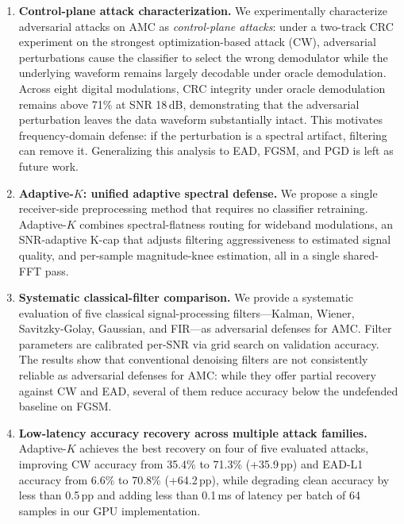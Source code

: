 \begin{enumerate}
\item \textbf{Control-plane attack characterization.}
  We experimentally characterize adversarial attacks on AMC as
  \emph{control-plane attacks}: under a two-track CRC experiment on the
  strongest optimization-based attack (CW), adversarial perturbations
  cause the classifier to select the wrong demodulator while the
  underlying waveform remains largely decodable under oracle
  demodulation. Across eight digital modulations, CRC integrity under
  oracle demodulation remains above 71\% at SNR 18\,dB, demonstrating
  that the adversarial perturbation leaves the data waveform
  substantially intact. This motivates frequency-domain defense: if the
  perturbation is a spectral artifact, filtering can remove it.
  Generalizing this analysis to EAD, FGSM, and PGD is left as future work.

\item \textbf{Adaptive-$K$: unified adaptive spectral defense.}
  We propose a single receiver-side preprocessing method that requires no
  classifier retraining. Adaptive-$K$ combines spectral-flatness routing
  for wideband modulations, an SNR-adaptive K-cap that adjusts filtering
  aggressiveness to estimated signal quality, and per-sample magnitude-knee
  estimation, all in a single shared-FFT pass.

\item \textbf{Systematic classical-filter comparison.}
  We provide a systematic evaluation of five classical signal-processing
  filters---Kalman, Wiener, Savitzky-Golay, Gaussian, and FIR---as adversarial
  defenses for AMC. Filter parameters are calibrated per-SNR via grid search
  on validation accuracy. The results show that conventional denoising
  filters are not consistently reliable as adversarial defenses for AMC:
  while they offer partial recovery against CW and EAD, several of them
  reduce accuracy below the undefended baseline on FGSM.

\item \textbf{Low-latency accuracy recovery across multiple attack families.}
  Adaptive-$K$ achieves the best recovery on four of five evaluated attacks,
  improving CW accuracy from 35.4\% to 71.3\% (+35.9\,pp) and EAD-L1 accuracy
  from 6.6\% to 70.8\% (+64.2\,pp), while degrading clean accuracy by less
  than 0.5\,pp and adding less than 0.1\,ms of latency per batch of 64
  samples in our GPU implementation.
\end{enumerate}

